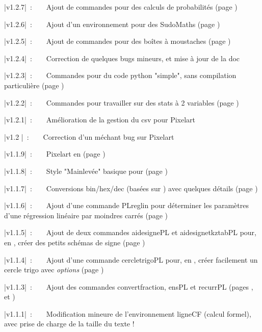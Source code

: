 \documentclass{article}
\newcommand\ctex[1]{\tcbox[vignettelatex]{#1}}
\begin{document}
{\small \bverb|v1.2.7|~:~~~~Ajout de commandes pour des calculs de probabilités (page \pageref{calcprobas})

{\small \bverb|v1.2.6|~:~~~~Ajout d'un environnement pour des SudoMaths (page \pageref{sudomaths})

{\small \bverb|v1.2.5|~:~~~~Ajout de commandes pour des boîtes à moustaches (page \pageref{boiteamoustaches})

{\small \bverb|v1.2.4|~:~~~~Correction de quelques bugs mineurs, et mise à jour de la doc

{\small \bverb|v1.2.3|~:~~~~Commandes pour du code python "simple", sans compilation particulière (page \pageref{pythonsimple})

{\small \bverb|v1.2.2|~:~~~~Commandes pour travailler sur des stats à 2 variables (page \pageref{statsdeuxvars})

{\small \bverb|v1.2.1|~:~~~~Amélioration de la gestion du csv pour Pixelart

{\small \bverb|v1.2  |~:~~~~Correction d'un méchant bug sur Pixelart

{\small \bverb|v1.1.9|~:~~~~Pixelart en \TikZ{} (page \pageref{pixelart})

{\small \bverb|v1.1.8|~:~~~~Style "Mainlevée" basique pour \TikZ (page \pageref{mainlevee})

{\small \bverb|v1.1.7|~:~~~~Conversions bin/hex/dec (basées sur \ctex{xintbinhex}) avec quelques détails (page \pageref{conversions})

{\small \bverb|v1.1.6|~:~~~~Ajout d'une commande \textsf{PLreglin} pour déterminer les paramètres d'une régression linéaire par moindres carrés (page \pageref{reglin})

{\small \bverb|v1.1.5|~:~~~~Ajout de deux commandes \textsf{aidesignePL} et \textsf{aidesignetkztabPL} pour, en \TikZ, créer des petits schémas \og de signe \fg{} (page \pageref{aidesigne})

{\small \bverb|v1.1.4|~:~~~~Ajout d'une commande \textsf{cercletrigoPL} pour, en \TikZ, créer facilement un cercle trigo avec \textit{options} (page \pageref{cercletrigo})

{\small \bverb|v1.1.3|~:~~~~Ajout des commandes \textsf{convertfraction}, \textsf{ensPL} et \textsf{recurrPL} (pages \pageref{convfrac}, \pageref{ensembles} et \pageref{recurr})

{\small \bverb|v1.1.1|~:~~~~Modification mineure de l'environnement \textsf{ligneCF} (calcul formel), avec prise de charge de la taille du texte !

}}}}}}}}}}}}}}}}
\end{document}
